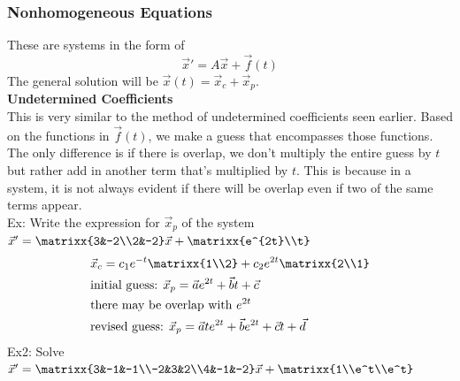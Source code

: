 \subsubsection{Nonhomogeneous Equations}
These are systems in the form of
$$\vec{x}'=A\vec{x}+\vec{f}(t)$$
The general solution will be $\vec{x}(t)=\vec{x}_c+\vec{x}_p$.\\

\textbf{Undetermined Coefficients}\\
This is very similar to the method of undetermined coefficients seen earlier. Based on the functions in $\vec{f}(t)$, we make a guess that encompasses those functions. The only difference is if there is overlap, we don't multiply the entire guess by $t$ but rather add in another term that's multiplied by $t$. This is because in a system, it is not always evident if there will be overlap even if two of the same terms appear.\\
Ex: Write the expression for $\vec{x}_p$ of the system $\vec{x}'=\matrixx{3&-2\\2&-2}\vec{x}+\matrixx{e^{2t}\\t}$
\begin{align*}
    &\vec{x}_c=c_1e^{-t}\matrixx{1\\2}+c_2e^{2t}\matrixx{2\\1}\\
    &\text{initial guess: }\vec{x}_p=\vec{a} e^{2t}+\vec{b} t+\vec{c}\\
    &\text{there may be overlap with }e^{2t}\\
    &\text{revised guess: }\vec{x}_p=\vec{a} te^{2t}+\vec{b} e^{2t}+\vec{c} t+\vec{d}
\end{align*}
Ex2: Solve $\vec{x}'=\matrixx{3&-1&-1\\-2&3&2\\4&-1&-2}\vec{x}+\matrixx{1\\e^t\\e^t}$
